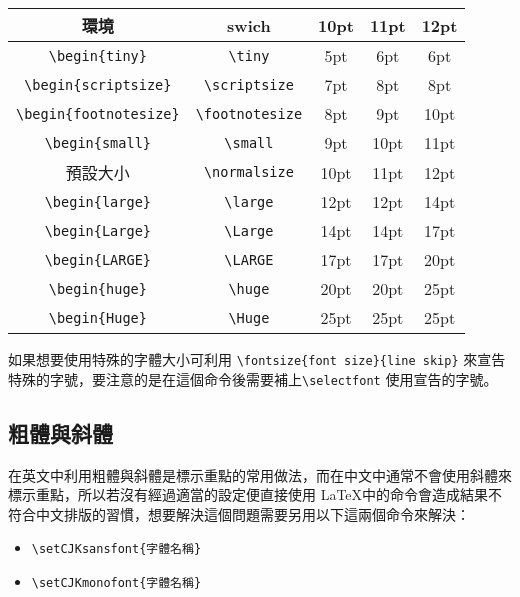 \begin{tabular}{ccccc}
\hline
環境 & swich & 10pt & 11pt & 12pt \\\hline\hline
\verb|\begin{tiny}| & \verb|\tiny|  & 5pt & 6pt & 6pt \\\hline
\verb|\begin{scriptsize}| & \verb|\scriptsize| & 7pt & 8pt & 8pt \\\hline
\verb|\begin{footnotesize}| & \verb|\footnotesize| & 8pt & 9pt & 10pt \\\hline
\verb|\begin{small}| & \verb|\small| & 9pt & 10pt & 11pt \\\hline
預設大小 & \verb|\normalsize| & 10pt & 11pt & 12pt \\\hline
\verb|\begin{large}| & \verb|\large| & 12pt & 12pt & 14pt \\\hline
\verb|\begin{Large}| & \verb|\Large| & 14pt & 14pt & 17pt \\\hline
\verb|\begin{LARGE}| & \verb|\LARGE| & 17pt & 17pt & 20pt \\\hline
\verb|\begin{huge}| & \verb|\huge| & 20pt & 20pt & 25pt \\\hline
\verb|\begin{Huge}| & \verb|\Huge| & 25pt & 25pt & 25pt \\\hline
\end{tabular}

如果想要使用特殊的字體大小可利用 \verb|\fontsize{font size}{line skip}| 來宣告特殊的字號，要注意的是在這個命令後需要補上\verb|\selectfont| 使用宣告的字號。


\subsection{粗體與斜體}

在英文中利用粗體與斜體是標示重點的常用做法，而在中文中通常不會使用斜體來標示重點，所以若沒有經過適當的設定便直接使用 \LaTeX 中的命令會造成結果不符合中文排版的習慣，想要解決這個問題需要另用以下這兩個命令來解決：

\begin{itemize}
\item \verb|\setCJKsansfont{字體名稱}|
\item \verb|\setCJKmonofont{字體名稱}|
\end{itemize}


